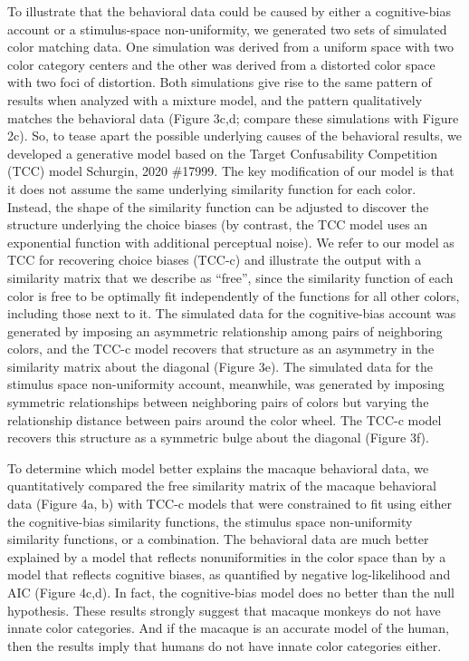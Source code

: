 To illustrate that the behavioral data could be caused by either a cognitive-bias account or a stimulus-space non-uniformity, we generated two sets of simulated color matching data. One simulation was derived from a uniform space with two color category centers and the other was derived from a distorted color space with two foci of distortion. Both simulations give rise to the same pattern of results when analyzed with a mixture model, and the pattern qualitatively matches the behavioral data (Figure 3c,d; compare these simulations with Figure 2c). So, to tease apart the possible underlying causes of the behavioral results, we developed a generative model based on the Target Confusability Competition (TCC) model {Schurgin, 2020 \#17999}. The key modification of our model is that it does not assume the same underlying similarity function for each color. Instead, the shape of the similarity function can be adjusted to discover the structure underlying the choice biases (by contrast, the TCC model uses an exponential function with additional perceptual noise). We refer to our model as TCC for recovering choice biases (TCC-c) and illustrate the output with a similarity matrix that we describe as “free”, since the similarity function of each color is free to be optimally fit independently of the functions for all other colors, including those next to it. The simulated data for the cognitive-bias account was generated by imposing an asymmetric relationship among pairs of neighboring colors, and the TCC-c model recovers that structure as an asymmetry in the similarity matrix about the diagonal (Figure 3e). The simulated data for the stimulus space non-uniformity account, meanwhile, was generated by imposing symmetric relationships between neighboring pairs of colors but varying the relationship distance between pairs around the color wheel. The TCC-c model recovers this structure as a symmetric bulge about the diagonal (Figure 3f). 

To determine which model better explains the macaque behavioral data, we quantitatively compared the free similarity matrix of the macaque behavioral data (Figure 4a, b) with TCC-c models that were constrained to fit using either the cognitive-bias similarity functions, the stimulus space non-uniformity similarity functions, or a combination.  The behavioral data are much better explained by a model that reflects nonuniformities in the color space than by a model that reflects cognitive biases, as quantified by negative log-likelihood and AIC (Figure 4c,d). In fact, the cognitive-bias model does no better than the null hypothesis. These results strongly suggest that macaque monkeys do not have innate color categories. And if the macaque is an accurate model of the human, then the results imply that humans do not have innate color categories either. 

